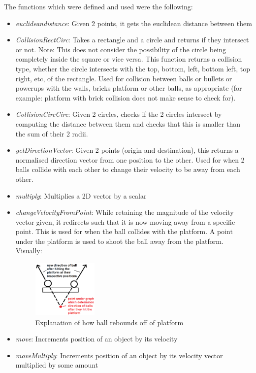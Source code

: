 The functions which were defined and used were the following:
\begin{itemize}
	\item \textit{euclidean\un distance}: Given 2 points, it gets the euclidean distance between them
	\item \textit{CollisionRectCirc}: Takes a rectangle and a circle and returns if they intersect or not. Note: This does not consider the possibility of the circle being completely inside the square or vice versa. This function returns a collision type, whether the circle intersects with the top, bottom, left, bottom left, top right, etc, of the rectangle. Used for collision between balls or bullets or powerups with the walls, bricks platform or other balls, as appropriate (for example: platform with brick collision does not make sense to check for).
	\item \textit{CollisionCircCirc}: Given 2 circles, checks if the 2 circles intersect by computing the distance between them and checks that this is smaller than the sum of their 2 radii.
	\item \textit{getDirectionVector}: Given 2 points (origin and destination), this returns a normalised direction vector from one position to the other. Used for when 2 balls collide with each other to change their velocity to be away from each other.
	\item \textit{multiply}: Multiplies a 2D vector by a scalar
	\item \textit{changeVelocityFromPoint}: While retaining the magnitude of the velocity vector given, it redirects such that it is now moving away from a specific point. This is used for when the ball collides with the platform. A point under the platform is used to shoot the ball away from the platform. Visually:
	\begin{figure}[H]
		\centering
		\includegraphics[width=0.3\textwidth]{Images/BallPlatform.png}
		\caption{Explanation of how ball rebounds off of platform}
	\end{figure}
	\item \textit{move}: Increments position of an object by its velocity
	\item \textit{moveMultiply}: Increments position of an object by its velocity vector multiplied by some amount
\end{itemize}

